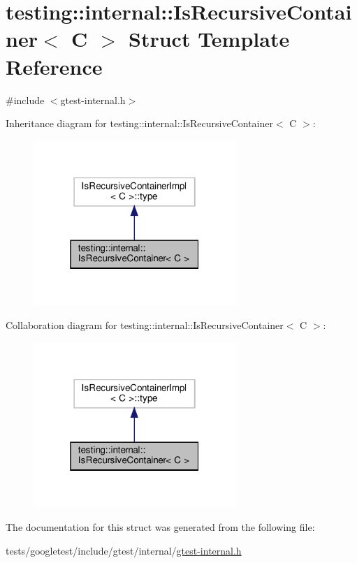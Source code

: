 \hypertarget{structtesting_1_1internal_1_1IsRecursiveContainer}{}\section{testing\+:\+:internal\+:\+:Is\+Recursive\+Container$<$ C $>$ Struct Template Reference}
\label{structtesting_1_1internal_1_1IsRecursiveContainer}


{\ttfamily \#include $<$gtest-\/internal.\+h$>$}



Inheritance diagram for testing\+:\+:internal\+:\+:Is\+Recursive\+Container$<$ C $>$\+:\nopagebreak
\begin{figure}[H]
\begin{center}
\leavevmode
\includegraphics[width=217pt]{structtesting_1_1internal_1_1IsRecursiveContainer__inherit__graph}
\end{center}
\end{figure}


Collaboration diagram for testing\+:\+:internal\+:\+:Is\+Recursive\+Container$<$ C $>$\+:\nopagebreak
\begin{figure}[H]
\begin{center}
\leavevmode
\includegraphics[width=217pt]{structtesting_1_1internal_1_1IsRecursiveContainer__coll__graph}
\end{center}
\end{figure}


The documentation for this struct was generated from the following file\+:\begin{DoxyCompactItemize}
\item 
tests/googletest/include/gtest/internal/\hyperlink{gtest-internal_8h}{gtest-\/internal.\+h}\end{DoxyCompactItemize}
